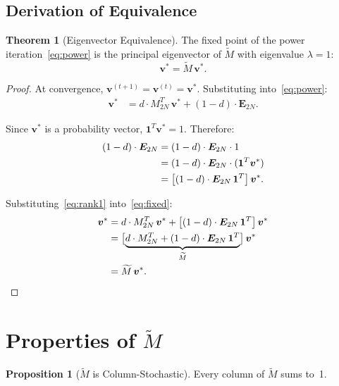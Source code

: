 \documentclass[11pt,a4paper]{article}
\theoremstyle{definition}
\newtheorem{theorem}{Theorem}
\newtheorem{proposition}{Proposition}
\begin{document}
\subsection{Derivation of Equivalence}

\begin{theorem}[{Eigenvector Equivalence}]\label{thm:equiv}
The fixed point of the power iteration~\eqref{eq:power} is the principal
eigenvector of $\widetilde{M}$ with eigenvalue $\lambda = 1$:
\[
\bm{v}^* = \widetilde{M}\,\bm{v}^*.
\]
\end{theorem}

\begin{proof}
At convergence, $\bm{v}^{(t+1)} = \bm{v}^{(t)} = \bm{v}^*$.
Substituting into~\eqref{eq:power}:
\begin{align}
\bm{v}^* &= d \cdot M_{2N}^T\,\bm{v}^*
           + (1-d) \cdot \bm{E}_{2N}. \label{eq:fixed}
\end{align}

Since $\bm{v}^*$ is a probability vector, $\bm{1}^T \bm{v}^* = 1$.
Therefore:
\begin{align}
(1-d) \cdot \bm{E}_{2N}
&= (1-d) \cdot \bm{E}_{2N} \cdot 1 \notag \\
&= (1-d) \cdot \bm{E}_{2N} \cdot (\bm{1}^T \bm{v}^*) \notag \\
&= \bigl[(1-d) \cdot \bm{E}_{2N}\,\bm{1}^T\bigr]\,\bm{v}^*. \label{eq:rank1}
\end{align}

Substituting~\eqref{eq:rank1} into~\eqref{eq:fixed}:
\begin{align}
\bm{v}^*
&= d \cdot M_{2N}^T\,\bm{v}^*
 + \bigl[(1-d) \cdot \bm{E}_{2N}\,\bm{1}^T\bigr]\,\bm{v}^* \notag \\
&= \bigl[\underbrace{d \cdot M_{2N}^T
 + (1-d) \cdot \bm{E}_{2N}\,\bm{1}^T}_{\widetilde{M}}\bigr]\,\bm{v}^* \notag \\
&= \widetilde{M}\,\bm{v}^*. \qedhere
\end{align}
\end{proof}

\section{\texorpdfstring{Properties of $\widetilde{M}$}{Properties of M-tilde}}

\begin{proposition}[{$\widetilde{M}$ is Column-Stochastic}]\label{prop:stochastic}
Every column of $\widetilde{M}$ sums to~1.
\end{proposition}
\end{document}
